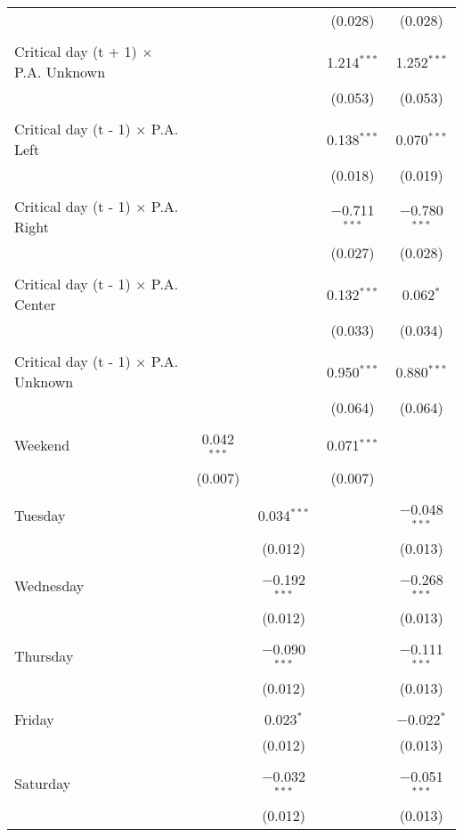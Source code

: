 \documentclass[
]{article}
\begin{document}
\begin{table}[!htbp]
{\begin{tabular}{@{\extracolsep{5pt}}lcccc}
  &  &  & (0.028) & (0.028) \\ 
  & & & & \\ 
 Critical day (t + 1) $\times$ P.A. Unknown &  &  & 1.214$^{***}$ & 1.252$^{***}$ \\ 
  &  &  & (0.053) & (0.053) \\ 
  & & & & \\ 
 Critical day (t - 1) $\times$ P.A. Left &  &  & 0.138$^{***}$ & 0.070$^{***}$ \\ 
  &  &  & (0.018) & (0.019) \\ 
  & & & & \\ 
 Critical day (t - 1) $\times$ P.A. Right &  &  & $-$0.711$^{***}$ & $-$0.780$^{***}$ \\ 
  &  &  & (0.027) & (0.028) \\ 
  & & & & \\ 
 Critical day (t - 1) $\times$ P.A. Center &  &  & 0.132$^{***}$ & 0.062$^{*}$ \\ 
  &  &  & (0.033) & (0.034) \\ 
  & & & & \\ 
 Critical day (t - 1) $\times$ P.A. Unknown &  &  & 0.950$^{***}$ & 0.880$^{***}$ \\ 
  &  &  & (0.064) & (0.064) \\ 
  & & & & \\ 
 Weekend & 0.042$^{***}$ &  & 0.071$^{***}$ &  \\ 
  & (0.007) &  & (0.007) &  \\ 
  & & & & \\ 
 Tuesday &  & 0.034$^{***}$ &  & $-$0.048$^{***}$ \\ 
  &  & (0.012) &  & (0.013) \\ 
  & & & & \\ 
 Wednesday &  & $-$0.192$^{***}$ &  & $-$0.268$^{***}$ \\ 
  &  & (0.012) &  & (0.013) \\ 
  & & & & \\ 
 Thursday &  & $-$0.090$^{***}$ &  & $-$0.111$^{***}$ \\ 
  &  & (0.012) &  & (0.013) \\ 
  & & & & \\ 
 Friday &  & 0.023$^{*}$ &  & $-$0.022$^{*}$ \\ 
  &  & (0.012) &  & (0.013) \\ 
  & & & & \\ 
 Saturday &  & $-$0.032$^{***}$ &  & $-$0.051$^{***}$ \\ 
  &  & (0.012) &  & (0.013) \\ 

\end{tabular}}
\end{table}
\end{document}
